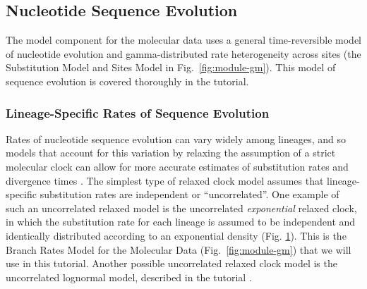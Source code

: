 \subsection{Nucleotide Sequence Evolution}\label{subsect:Intro-GTR}

The model component for the molecular data uses a general time-reversible model of nucleotide evolution and gamma-distributed rate heterogeneity across sites (the \textsf{Substitution Model} and \textsf{Sites Model} in Fig.\ \ref{fig:module-gm}). %
This model of sequence evolution is covered thoroughly in the \href{https://github.com/revbayes/revbayes_tutorial/raw/master/tutorial_TeX/RB_CTMC_Tutorial/RB_CTMC_Tutorial.pdf}{} tutorial.


\subsubsection{Lineage-Specific Rates of Sequence Evolution}\label{subsub:Intro-GTR-UExp}

Rates of nucleotide sequence evolution can vary widely among lineages, and so models that account for this variation by relaxing the assumption of a strict molecular clock \citep{Zuckerkandl1962} can allow for more accurate estimates of substitution rates and divergence times \citep{Drummond2006}.
The simplest type of relaxed clock model assumes that lineage-specific substitution rates are independent or ``uncorrelated''.
One example of such an uncorrelated relaxed model is the uncorrelated \textit{exponential} relaxed clock, in which the substitution rate for each lineage is assumed to be independent and identically distributed according to an exponential density (Fig. \ref{fig:uexp_gm}).
This is the \textsf{Branch Rates Model} for the \textsf{Molecular Data} (\IE Fig.\ \ref{fig:module-gm}) that we will use in this tutorial.
Another possible uncorrelated relaxed clock model is the uncorrelated lognormal model, described in the \href{https://github.com/revbayes/revbayes_tutorial/raw/master/tutorial_TeX/RB_Dating_Tutorial/RB_Dating_Tutorial.pdf}{} tutorial \citep[also see][]{Thorne2002,Heath2013}.
\begin{figure}[h!]
\label{fig:uexp_gm}
\end{figure}


